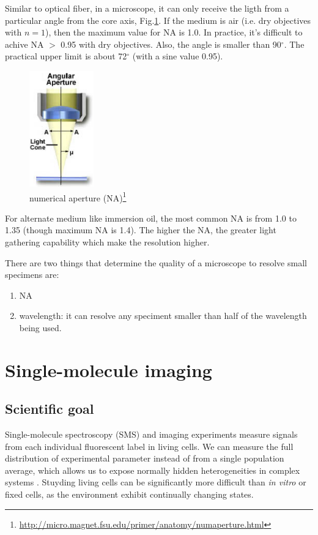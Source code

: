 Similar to optical fiber, in a microscope, it can only receive the ligth from a
particular angle from the core axis, Fig.\ref{fig:NA}. If the medium is air
(i.e. dry objectives with $n=1$), then the maximum value for NA is 1.0. In
practice, it's difficult to achive NA $>$ 0.95 with dry objectives. Also, the
angle is smaller than 90$^\circ$. The practical upper limit is about 72$^\circ$
(with a sine value 0.95).


\begin{figure}[hbt]
  \centerline{\includegraphics[height=5cm,
    angle=0]{./images/NA.eps}}
  \caption{numerical aperture
  (NA)\footnote{\url{http://micro.magnet.fsu.edu/primer/anatomy/numaperture.html}}}
  \label{fig:NA}
\end{figure}

For alternate medium like immersion oil, the
most common NA is from 1.0 to 1.35 (though maximum NA is 1.4). The higher the
NA, the greater light gathering capability which make the resolution higher. 

There are two things that determine the quality of a microscope to resolve small
specimens are:
\begin{enumerate}
  \item NA 
  \item wavelength: it can resolve any speciment smaller than half of the
  wavelength being used.
\end{enumerate}



\section{Single-molecule imaging}

\subsection{Scientific goal}

Single-molecule spectroscopy (SMS) and imaging experiments measure signals from
each individual fluorescent label in living cells. We can measure the full
distribution of experimental parameter instead of from a single population
average, which allows us to expose normally hidden heterogeneities in complex
systems \citep{lord2010}. Stuyding living cells can be significantly more
difficult than {\it in vitro} or fixed cells, as the environment exhibit
continually changing states.

